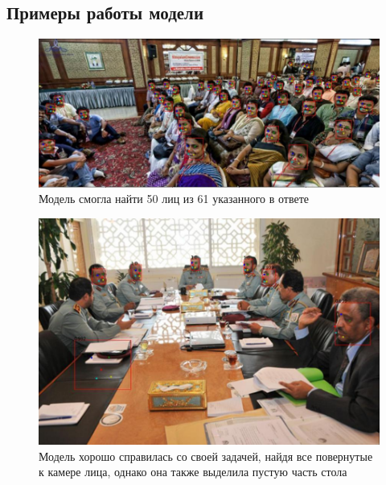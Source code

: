 \subsection{Примеры работы модели}\label{subsec:примеры-работы-модели}
\begin{figure}[h]
    \center
    \includegraphics[width=0.9\linewidth]{images/good1.jpg}
    \caption{Модель смогла найти 50 лиц из 61 указанного в ответе}
    \label{ris:images/good1.jpg}
\end{figure}

\begin{figure}[h]
    \center
    \includegraphics[width=0.9\linewidth]{images/norm1.jpg}
    \caption{Модель хорошо справилась со своей задачей, найдя все повернутые к камере лица, однако она также выделила пустую часть стола}
    \label{ris:images/norm1.jpg}
\end{figure}
